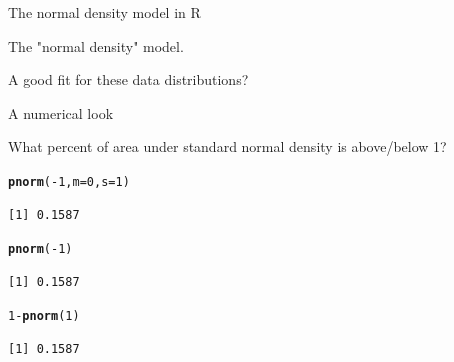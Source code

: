\documentclass{beamer}\usepackage[]{graphicx}\usepackage[]{color}
\makeatletter
\newcommand{\hlnum}[1]{\textcolor[rgb]{0.2,0.2,0.2}{#1}}%
\newcommand{\hlopt}[1]{\textcolor[rgb]{0.102,0.102,0.102}{#1}}%
\newcommand{\hlstd}[1]{\textcolor[rgb]{0.102,0.102,0.102}{#1}}%
\newcommand{\hlkwc}[1]{\textcolor[rgb]{0.2,0.2,0.2}{#1}}%
\newcommand{\hlkwd}[1]{\textcolor[rgb]{0.102,0.102,0.102}{\textbf{#1}}}%
\newenvironment{kframe}{%
 \def\at@end@of@kframe{}%
 \ifinner\ifhmode%
  \def\at@end@of@kframe{\end{minipage}}%
  \begin{minipage}{\columnwidth}%
 \fi\fi%
 \def\FrameCommand##1{\hskip\@totalleftmargin \hskip-\fboxsep
 \colorbox{shadecolor}{##1}\hskip-\fboxsep
     \hskip-\linewidth \hskip-\@totalleftmargin \hskip\columnwidth}%
 \MakeFramed {\advance\hsize-\width
   \@totalleftmargin\z@ \linewidth\hsize
   \@setminipage}}%
 {\par\unskip\endMakeFramed%
 \at@end@of@kframe}
\newenvironment{knitrout}{}{} %
\renewenvironment{knitrout}{\begin{spacing}{0.75}\begin{tiny}}{\end{tiny}\end{spacing}}
\makeatother
\begin{document}
\begin{frame}{The normal density model in R\;\;}

The "normal density" model.  \newline

A good fit for these data distributions? \newline

A numerical look \newline 

What percent of area under standard normal density is above/below 1?
\begin{knitrout}\small
{}\color{fgcolor}\begin{kframe}
\begin{alltt}
\hlkwd{pnorm}\hlstd{(}\hlopt{-}\hlnum{1}\hlstd{,} \hlkwc{m}\hlstd{=}\hlnum{0}\hlstd{,} \hlkwc{s}\hlstd{=}\hlnum{1}\hlstd{)}
\end{alltt}
\begin{verbatim}
[1] 0.1587
\end{verbatim}
\begin{alltt}
\hlkwd{pnorm}\hlstd{(}\hlopt{-}\hlnum{1}\hlstd{)}
\end{alltt}
\begin{verbatim}
[1] 0.1587
\end{verbatim}
\begin{alltt}
\hlnum{1} \hlopt{-} \hlkwd{pnorm}\hlstd{(}\hlnum{1}\hlstd{)}
\end{alltt}
\begin{verbatim}
[1] 0.1587
\end{verbatim}
\end{kframe}
\end{knitrout}
\newpage


\end{frame}
\end{document}
